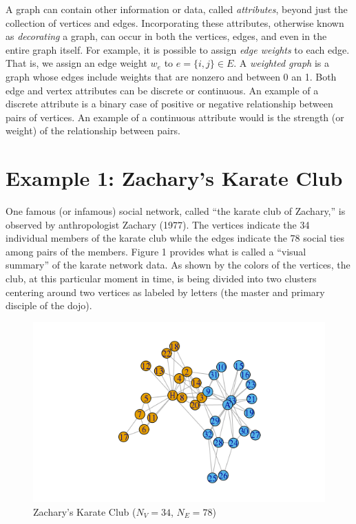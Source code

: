 \documentclass[12pt,twoside]{amherstthesis}
\begin{document}
  A graph can contain other information or data, called \emph{attributes},
  beyond just the collection of vertices and edges. Incorporating these
  attributes, otherwise known as \emph{decorating} a graph, can occur in
  both the vertices, edges, and even in the entire graph itself. For
  example, it is possible to assign \emph{edge weights} to each edge. That
  is, we assign an edge weight \(w_e\) to \(e = \{i, j\} \in E\). A
  \emph{weighted graph} is a graph whose edges include weights that are
  nonzero and between 0 an 1. Both edge and vertex attributes can be
  discrete or continuous. An example of a discrete attribute is a binary
  case of positive or negative relationship between pairs of vertices. An
  example of a continuous attribute would is the strength (or weight) of
  the relationship between pairs.
  
  \section{Example 1: Zachary's Karate
  Club}\label{example-1-zacharys-karate-club}
  
  One famous (or infamous) social network, called ``the karate club of
  Zachary,'' is observed by anthropologist Zachary (1977). The vertices
  indicate the 34 individual members of the karate club while the edges
  indicate the 78 social ties among pairs of the members. Figure 1
  provides what is called a ``visual summary'' of the karate network data.
  As shown by the colors of the vertices, the club, at this particular
  moment in time, is being divided into two clusters centering around two
  vertices as labeled by letters (the master and primary disciple of the
  dojo).
  
  \begin{figure}[htbp]
  \centering
  \includegraphics{figure/01karateplot.png}
  \caption{Zachary's Karate Club (\(N_V = 34\), \(N_E = 78\))}
  \end{figure}
  
\end{document}
